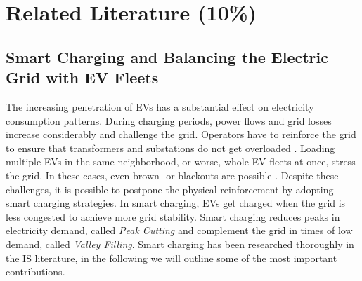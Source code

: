\documentclass[12pt, article]{article}
\begin{document}
\clearpage
\section{Related Literature (10\%)}
\label{sec:org4a2e975}
\subsection{Smart Charging and Balancing the Electric Grid with EV Fleets}
\label{sec:orgb109428}
The increasing penetration of EVs has a substantial effect on electricity
consumption patterns. During charging periods, power flows and grid losses
increase considerably and challenge the grid. Operators have to reinforce the
grid to ensure that transformers and substations do not get overloaded
\parencite{sioshansi12_impac_elect_tarif_plug_in,lopes11_integ_elect_vehic_elect_power_system}.
Loading multiple EVs in the same neighborhood, or worse, whole EV fleets at
once, stress the grid. In these cases, even brown- or blackouts are possible
. Despite these challenges, it is possible to postpone the
physical reinforcement by adopting smart charging strategies. In smart charging,
EVs get charged when the grid is less congested to achieve more grid stability.
Smart charging reduces peaks in electricity demand, called \emph{Peak Cutting} and
complement the grid in times of low demand, called \emph{Valley Filling}. Smart
charging has been researched thoroughly in the IS literature, in the following
we will outline some of the most important contributions.
\end{document}
